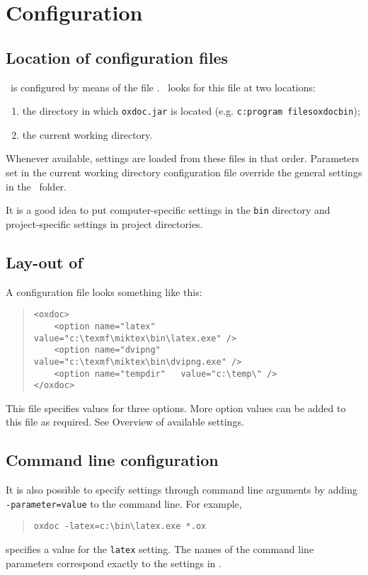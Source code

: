 \chapter{Configuration}

\section{Location of configuration files}
\oxdoc~is configured by means of the file \oxdocxml.
\oxdoc~looks for this file at two locations:
\begin{enumerate}
\item the directory in which {\tt oxdoc.jar}
is located (e.g. {\tt c:\bs program files\bs oxdoc\bs bin});
\item the current working directory.
\end{enumerate}

Whenever available, settings are loaded from these files in that order.
Parameters set in the current working directory configuration file override
the general settings in the \oxdoc~folder.

It is a good idea to put computer-specific settings in the {\tt bin}
directory and project-specific settings in project directories. 

\section{Lay-out of \oxdocxml}
A configuration file looks something like this:

\begin{quote}
\small\begin{verbatim}
<oxdoc>
	<option name="latex"     value="c:\texmf\miktex\bin\latex.exe" />
	<option name="dvipng"    value="c:\texmf\miktex\bin\dvipng.exe" />
	<option name="tempdir"   value="c:\temp\" />
</oxdoc>
\end{verbatim}
\end{quote}

This file specifies values for three options. More option values can be added to
this file as required. See Overview of available settings.

\section{Command line configuration}
It is also possible to specify settings through command line arguments
by adding {\tt -parameter=value} to the command line. 
For example,
\begin{quote}
\small\begin{verbatim}
oxdoc -latex=c:\bin\latex.exe *.ox
\end{verbatim}
\end{quote}
specifies a value for the {\tt latex} setting. The names of the
command line parameters correspond exactly to the settings in 
\oxdocxml.

